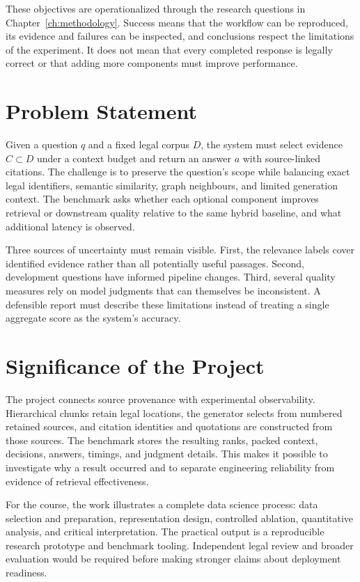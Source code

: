 \documentclass[11pt,a4paper,oneside]{report}
\begin{document}
These objectives are operationalized through the research questions in Chapter~\ref{ch:methodology}. Success means that the workflow can be reproduced, its evidence and failures can be inspected, and conclusions respect the limitations of the experiment. It does not mean that every completed response is legally correct or that adding more components must improve performance.

\section{Problem Statement}
Given a question $q$ and a fixed legal corpus $D$, the system must select evidence $C\subset D$ under a context budget and return an answer $a$ with source-linked citations. The challenge is to preserve the question's scope while balancing exact legal identifiers, semantic similarity, graph neighbours, and limited generation context. The benchmark asks whether each optional component improves retrieval or downstream quality relative to the same hybrid baseline, and what additional latency is observed.

Three sources of uncertainty must remain visible. First, the relevance labels cover identified evidence rather than all potentially useful passages. Second, development questions have informed pipeline changes. Third, several quality measures rely on model judgments that can themselves be inconsistent. A defensible report must describe these limitations instead of treating a single aggregate score as the system's accuracy.

\section{Significance of the Project}
The project connects source provenance with experimental observability. Hierarchical chunks retain legal locations, the generator selects from numbered retained sources, and citation identities and quotations are constructed from those sources. The benchmark stores the resulting ranks, packed context, decisions, answers, timings, and judgment details. This makes it possible to investigate why a result occurred and to separate engineering reliability from evidence of retrieval effectiveness.

For the course, the work illustrates a complete data science process: data selection and preparation, representation design, controlled ablation, quantitative analysis, and critical interpretation. The practical output is a reproducible research prototype and benchmark tooling. Independent legal review and broader evaluation would be required before making stronger claims about deployment readiness.
\end{document}
